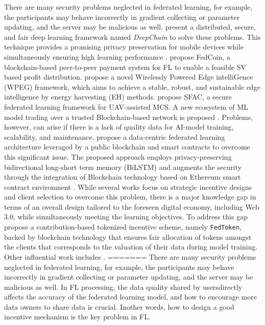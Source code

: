 \documentclass{article}
\begin{document}
There are many security problems neglected in federated learning, for example, the participants may behave incorrectly in gradient collecting or parameter updating, and the server may be malicious as well. \cite{weng_2019} present a distributed, secure, and fair deep learning framework named \textit{DeepChain} to solve these problems. This technique provides a promising privacy preservation for mobile devices while simultaneously ensuring high learning performance \cite{kang_2019}. \cite{liu_fedcoin_2020} propose FedCoin, a blockchain-based peer-to-peer payment system for FL to enable a feasible SV based profit distribution. \cite{lin_2022} propose a novel Wirelessly Powered Edge intelliGence (WPEG) framework, which aims to achieve a stable, robust, and sustainable edge intelligence by energy harvesting (EH) methods. \cite{wang_2020} propose SFAC, a secure federated learning framework for UAV-assisted MCS. A new ecosystem of ML model trading over a trusted Blockchain-based network is proposed \cite{nguyen_2021}. Problems, however, can arise if there is a lack of quality data for AI-model training, scalability, and maintenance. \cite{chaabene_2022} propose a data-centric federated learning architecture leveraged by a public blockchain and smart contracts to overcome this significant issue. The proposed approach employs privacy-preserving bidirectional long-short term memory (BiLSTM) and augments the security through the integration of Blockchain technology based on Ethereum smart contract environment \cite{rahmadika_2022}. While several works focus on strategic incentive designs and client selection to overcome this problem, there is a major knowledge gap in terms of an overall design tailored to the foreseen digital economy, including Web 3.0, while simultaneously meeting the learning objectives. To address this gap \cite{pandey_2022} propose a contribution-based tokenized incentive scheme, namely \texttt{FedToken}, backed by blockchain technology that ensures fair allocation of tokens amongst the clients that corresponds to the valuation of their data during model training. Other influential work includes \cite{lu_2020}.
=======
There are many security problems neglected in federated learning, for example, the participants may behave incorrectly in gradient collecting or parameter updating, and the server may be malicious as well. In FL processing, the data quality shared by usersdirectly aﬀects the accuracy of the federated learning model, and how to encourage more data owners to share data is crucial. Inother words, how to design a good incentive mechanism is the key problem in FL. 
\end{document}
